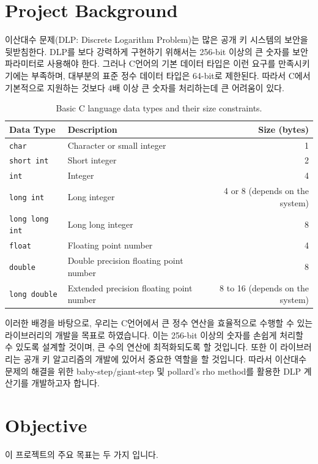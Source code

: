 \documentclass[12pt,a4paper]{article}
\begin{document}
	\section{Project Background}
	이산대수 문제(DLP: Discrete Logarithm Problem)는 많은 공개 키 시스템의 보안을 뒷받침한다.  DLP를 보다 강력하게 구현하기 위해서는 256-bit 이상의 큰 숫자를 보안 파라미터로 사용해야 한다. 그러나 C언어의 기본 데이터 타입은 이런 요구를 만족시키기에는 부족하며, 대부분의 표준 정수 데이터 타입은 64-bit로 제한된다. 따라서 C에서 기본적으로 지원하는 것보다 4배 이상 큰 숫자를 처리하는데 큰 어려움이 있다.
	\\
	\begin{table}[h!]
		\centering
		\begin{tabularx}{\textwidth}{lXr}
			\toprule
			\textbf{Data Type} & \textbf{Description} & \textbf{Size (bytes)} \\
			\midrule
			\texttt{char} & Character or small integer & 1 \\
			\texttt{short int} & Short integer & 2 \\
			\texttt{int} & Integer & 4 \\
			\texttt{long int} & Long integer & 4 or 8 (depends on the system) \\
			\texttt{long long int} & Long long integer & 8 \\
			\texttt{float} & Floating point number & 4 \\
			\texttt{double} & Double precision floating point number & 8 \\
			\texttt{long double} & Extended precision floating point number & 8 to 16 (depends on the system) \\
			\bottomrule
		\end{tabularx}
		\caption{Basic C language data types and their size constraints.}
		\label{tab:c_data_types}
	\end{table}

	이러한 배경을 바탕으로, 우리는 C언어에서 큰 정수 연산을 효율적으로 수행할 수 있는 라이브러리의 개발을 목표로 하였습니다. 이는 256-bit 이상의 숫자를 손쉽게 처리할 수 있도록 설계할 것이며, 큰 수의 연산에 최적화되도록 할 것입니다. 또한 이 라이브러리는 공개 키 알고리즘의 개발에 있어서 중요한 역할을 할 것입니다. 따라서 이산대수 문제의 해결을 위한 baby-step/giant-step 및 pollard's rho method를 활용한 DLP 계산기를 개발하고자 합니다.
	\vspace{20pt}
	\section{Objective}
	이 프로젝트의 주요 목표는 두 가지 입니다.
	
\end{document}
